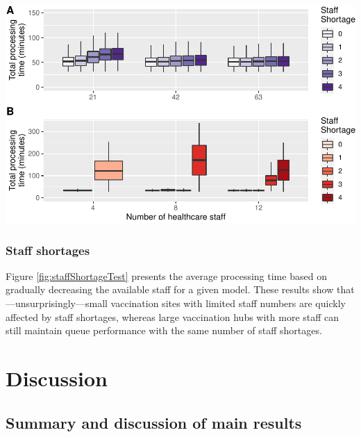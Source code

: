 \documentclass{article}
\let\origfigure\figure
\let\endorigfigure\endfigure
\renewenvironment{figure}[1][2] {
    \expandafter\origfigure\expandafter[H]
} {
    \endorigfigure
}
\begin{document}
\begin{figure}

{\centering \includegraphics{Preprint_files/figure-latex/staffShortageTest-1} 

}

\caption{Increase in processing time with staff shortages by site size}\label{fig:staffShortageTest}
\end{figure}

\hypertarget{staff-shortages}{%
\subsubsection{Staff shortages}\label{staff-shortages}}

Figure \ref{fig:staffShortageTest} presents the average processing time
based on gradually decreasing the available staff for a given model.
These results show that---unsurprisingly---small vaccination sites with
limited staff numbers are quickly affected by staff shortages, whereas
large vaccination hubs with more staff can still maintain queue
performance with the same number of staff shortages.

\hypertarget{discussion}{%
\section{Discussion}\label{discussion}}

\hypertarget{summary-and-discussion-of-main-results}{%
\subsection{Summary and discussion of main
results}\label{summary-and-discussion-of-main-results}}
\end{document}
